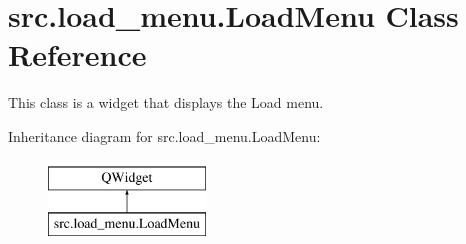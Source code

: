\hypertarget{classsrc_1_1load__menu_1_1_load_menu}{}\section{src.\+load\+\_\+menu.\+Load\+Menu Class Reference}
\label{classsrc_1_1load__menu_1_1_load_menu}


This class is a widget that displays the Load menu.  


Inheritance diagram for src.\+load\+\_\+menu.\+Load\+Menu\+:\begin{figure}[H]
\begin{center}
\leavevmode
\includegraphics[height=2.000000cm]{classsrc_1_1load__menu_1_1_load_menu}
\end{center}
\end{figure}
